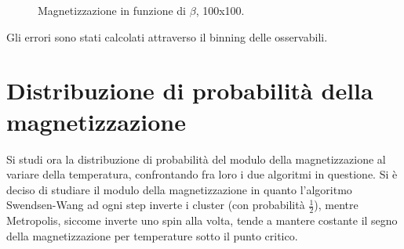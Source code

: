 \begin{figure}[h]
\caption{Magnetizzazione in funzione di $\beta$, 100x100.}

\end{figure}

Gli errori sono stati calcolati attraverso il binning delle osservabili.
\section{Distribuzione di probabilità della magnetizzazione}
Si studi ora la distribuzione di probabilità del modulo della magnetizzazione al variare della temperatura, confrontando fra loro i due algoritmi in questione.
Si è deciso di studiare il modulo della magnetizzazione in quanto l'algoritmo Swendsen-Wang ad ogni step inverte i cluster (con probabilità $\frac{1}{2}$), mentre Metropolis, siccome inverte uno spin alla volta, tende a mantere costante il segno della magnetizzazione per temperature sotto il punto critico.


